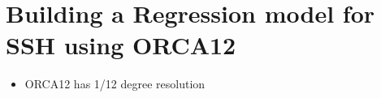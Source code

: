 

\section{Building a Regression model for SSH using ORCA12}
\label{sec:3_ORCA12_REG.tex}

\begin{itemize}
    \item ORCA12 has 1/12 degree resolution
\end{itemize}
